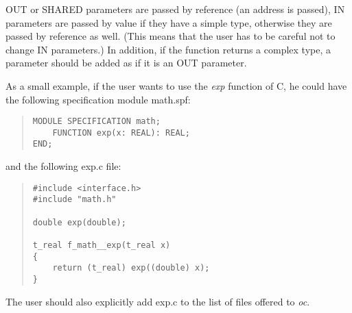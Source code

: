 \documentclass[10pt]{article}
\begin{document}
OUT or SHARED parameters are passed by reference (an address is passed),
IN parameters are passed by value if they have a simple type, otherwise
they are passed by reference as well.
(This means that the user has to be careful not to change IN parameters.)
In addition, if the function returns a complex type, a parameter should be
added as if it is an OUT parameter.

As a small example, if the user wants to use the
{\em exp}
function of C, he could have the following specification module math.spf:
\begin{quote}
\begin{verbatim}
MODULE SPECIFICATION math;
    FUNCTION exp(x: REAL): REAL;
END;
\end{verbatim}
\end{quote}
and the following exp.c file:
\begin{quote}
\begin{verbatim}
#include <interface.h>
#include "math.h"

double exp(double);

t_real f_math__exp(t_real x)
{
    return (t_real) exp((double) x);
}
\end{verbatim}
\end{quote}

The user should also explicitly add exp.c to the list of files offered to
{\em oc}.
\end{document}
